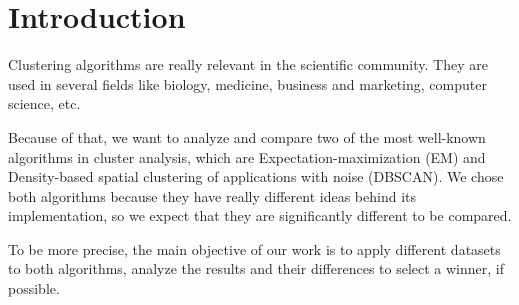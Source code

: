 \section{Introduction}
Clustering algorithms are really relevant in the scientific community. They are used in several fields like biology, medicine, business and marketing, computer science, etc.

Because of that, we want to analyze and compare two of the most well-known algorithms in cluster analysis, which are Expectation-maximization (EM) and Density-based spatial clustering of applications with noise (DBSCAN). We chose both algorithms because they have really different ideas behind its implementation, so we expect that they are significantly different to be compared.

To be more precise, the main objective of our work is to apply different datasets to both algorithms, analyze the results and their differences to select a winner, if possible.